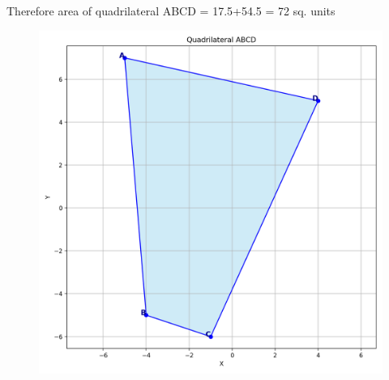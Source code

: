 \documentclass[journal]{IEEEtran}
\begin{document}
Therefore area of quadrilateral ABCD = 17.5+54.5 = 72 sq. units

\begin{figure}
    \centering
    \includegraphics[width=0.5\linewidth]{figs/quadrilateral_ABCD.png}
    \caption{}
    \label{fig:placeholder}
\end{figure}
\end{document}
